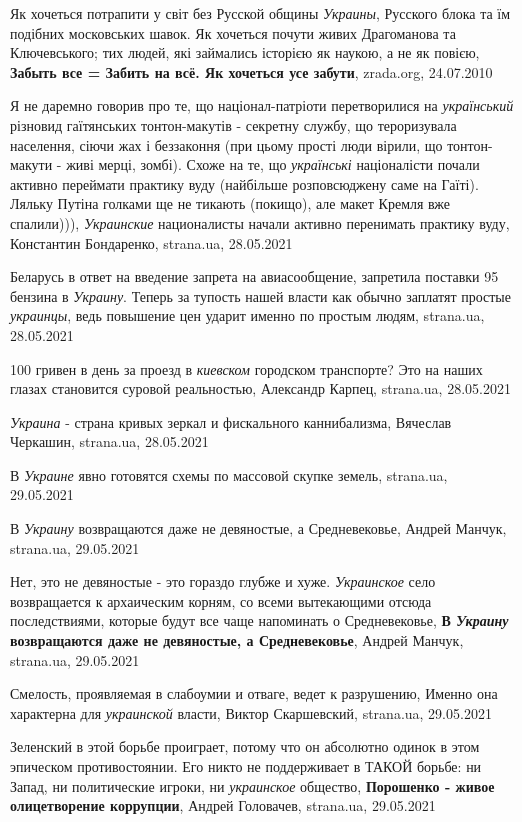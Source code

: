 Як хочеться потрапити у світ без Русской общины \emph{Украины}, Русского блока
та їм подібних московських шавок.  Як хочеться почути живих Драгоманова та
Ключевського; тих людей, які займались історією як наукою, а не як повією,
\textbf{Забыть все = Забить на всё. Як хочеться усе забути}, zrada.org,
24.07.2010

Я не даремно говорив про те, що націонал-патріоти перетворилися на
\emph{український} різновид гаїтянських тонтон-макутів - секретну службу, що
тероризувала населення, сіючи жах і беззаконня (при цьому прості люди вірили,
що тонтон-макути - живі мерці, зомбі).  Схоже на те, що \emph{українські}
націоналісти почали активно переймати практику вуду (найбільше розповсюджену
саме на Гаїті).  Ляльку Путіна голками ще не тикають (покищо), але макет Кремля
вже спалили))), \emph{Украинские} националисты начали активно перенимать
практику вуду, Константин Бондаренко, strana.ua, 28.05.2021

Беларусь в ответ на введение запрета на авиасообщение, запретила поставки 95
бензина в \emph{Украину}. Теперь за тупость нашей власти как обычно заплатят
простые \emph{украинцы}, ведь повышение цен ударит именно по простым людям,
strana.ua, 28.05.2021

100 гривен в день за проезд в \emph{киевском} городском транспорте?  Это на
наших глазах становится суровой реальностью, Александр Карпец, strana.ua,
28.05.2021

\emph{Украина} - страна кривых зеркал и фискального каннибализма, Вячеслав
Черкашин, strana.ua, 28.05.2021

В \emph{Украине} явно готовятся схемы по массовой скупке земель, strana.ua,
29.05.2021

В \emph{Украину} возвращаются даже не девяностые, а Средневековье, Андрей
Манчук, strana.ua, 29.05.2021

Нет, это не девяностые - это гораздо глубже и хуже. \emph{Украинское} село
возвращается к архаическим корням, со всеми вытекающими отсюда последствиями,
которые будут все чаще напоминать о Средневековье, \textbf{В \emph{Украину}
возвращаются даже не девяностые, а Средневековье}, Андрей Манчук, strana.ua,
29.05.2021

Смелость, проявляемая в слабоумии и отваге, ведет к разрушению, Именно она
характерна для \emph{украинской} власти, Виктор Скаршевский, strana.ua, 29.05.2021

Зеленский в этой борьбе проиграет, потому что он абсолютно одинок в этом
эпическом противостоянии. Его никто не поддерживает в ТАКОЙ борьбе: ни Запад,
ни политические игроки, ни \emph{украинское} общество, \textbf{Порошенко -
живое олицетворение коррупции}, Андрей Головачев, strana.ua, 29.05.2021

